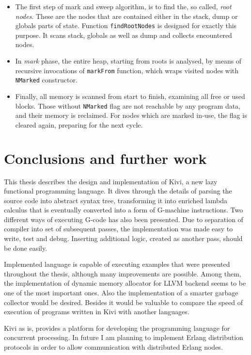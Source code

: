 \documentclass[12pt,a4paper]{report}
\begin{document}
\begin{itemize}
  \item The first step of mark and sweep algorithm, is to find the, so called,
    \textit{root nodes}. These are the nodes that are contained either in the
    stack, dump or globals parts of state. Function \texttt{findRootNodes} is
    designed for exactly this purpose. It scans stack, globals as well as dump
    and collects encountered nodes.
  \item In \textit{mark} phase, the entire heap, starting from roots is
    analysed, by means of recursive invocations of \texttt{markFrom} function,
    which wraps visited nodes with \texttt{NMarked} constructor.
  \item Finally, all memory is scanned from start to finish, examining all free
    or used blocks. Those without \texttt{NMarked} flag are not reachable
    by any program data, and their memory is reclaimed. For nodes which are
    marked in-use, the flag is cleared again, preparing for the next
    cycle.
\end{itemize}

\chapter{Conclusions and further work}
This thesis describes the design and implementation of Kivi, a new lazy
functional programming language. It dives through the details of parsing the
source code into abstract syntax tree, transforming it into enriched lambda
calculus that is eventually converted into a form of G-machine instructions.
Two different ways of executing G-code has also been presented. Due to
separation of compiler into set of subsequent passes, the implementation was
made easy to write, test and debug. Inserting additional logic, created as
another pass, should be done easily.

Implemented language is capable of executing examples that were presented
throughout the thesis, although many improvements are possible. Among them, the
implementation of dynamic memory allocator for LLVM backend seems to be one of
the most important ones. Also the implementation of a smarter garbage collector
would be desired. Besides it would be valuable to compare the speed of
execution of programs written in Kivi with another languages.

Kivi as is, provides a platform for developing the programming language for
concurrent processing. In future I am planning to implement Erlang distribution
protocols in order to allow communication with distributed Erlang nodes.




\end{document}
